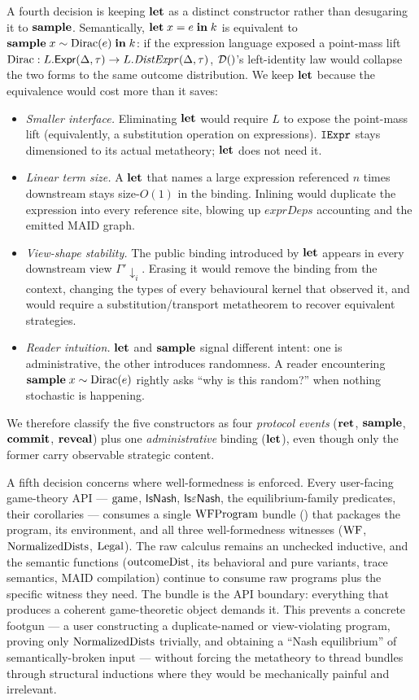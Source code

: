 \documentclass[11pt]{article}
\begin{document}
A fourth decision is keeping $\mathbf{let}$ as a distinct constructor rather than
desugaring it to $\mathbf{sample}$. Semantically, $\mathbf{let}\;x = e\;\mathbf{in}\;k$ is
equivalent to $\mathbf{sample}\;x \sim \mathrm{Dirac}(e)\;\mathbf{in}\;k$: if the
expression language exposed a point-mass lift $\mathrm{Dirac} :
L.\mathsf{Expr}(\Delta,\tau) \to L.\mathit{DistExpr}(\Delta,\tau)$, $\mathcal{D}()$'s
left-identity law would collapse the two forms to the same outcome
distribution. We keep $\mathbf{let}$ because the equivalence would cost more than
it saves:
\begin{itemize}[nosep]
\item \emph{Smaller interface.} Eliminating $\mathbf{let}$ would require $L$ to
      expose the point-mass lift (equivalently, a substitution operation
      on expressions). $\texttt{IExpr}$ stays dimensioned to its actual
      metatheory; $\mathbf{let}$ does not need it.
\item \emph{Linear term size.} A $\mathbf{let}$ that names a large expression
      referenced $n$ times downstream stays size-$O(1)$ in the binding.
      Inlining would duplicate the expression into every reference site,
      blowing up $\mathit{exprDeps}$ accounting and the emitted MAID graph.
\item \emph{View-shape stability.} The public binding introduced by $\mathbf{let}$
      appears in every downstream view $\Gamma'\!\!\downarrow_i$. Erasing
      it would remove the binding from the context, changing the types of
      every behavioural kernel that observed it, and would require a
      substitution/transport metatheorem to recover equivalent strategies.
\item \emph{Reader intuition.} $\mathbf{let}$ and $\mathbf{sample}$ signal different
      intent: one is administrative, the other introduces randomness. A
      reader encountering $\mathbf{sample}\;x \sim \mathrm{Dirac}(e)$ rightly asks
      ``why is this random?'' when nothing stochastic is happening.
\end{itemize}
We therefore classify the five constructors as four \emph{protocol events}
($\mathbf{ret}$, $\mathbf{sample}$, $\mathbf{commit}$, $\mathbf{reveal}$) plus one \emph{administrative}
binding ($\mathbf{let}$), even though only the former carry observable strategic
content.

A fifth decision concerns where well-formedness is enforced. Every
user-facing game-theory API --- $\mathrm{game}$, $\mathsf{IsNash}$,
$\mathsf{IsεNash}$, the equilibrium-family predicates, their corollaries ---
consumes a single $\mathrm{WFProgram}$ bundle () that packages the
program, its environment, and all three well-formedness witnesses
($\mathrm{WF}$, $\mathrm{NormalizedDists}$, $\mathrm{Legal}$). The raw calculus  remains an
unchecked inductive, and the semantic functions ($\mathrm{outcomeDist}$, its
behavioral and pure variants, trace semantics, MAID compilation) continue
to consume raw programs plus the specific witness they need. The bundle
is the API boundary: everything that produces a coherent game-theoretic
object demands it. This prevents a concrete footgun --- a user
constructing a duplicate-named or view-violating program, proving only
$\mathrm{NormalizedDists}$ trivially, and obtaining a ``Nash equilibrium'' of
semantically-broken input --- without forcing the metatheory to thread
bundles through structural inductions where they would be mechanically
painful and irrelevant.
\end{document}
